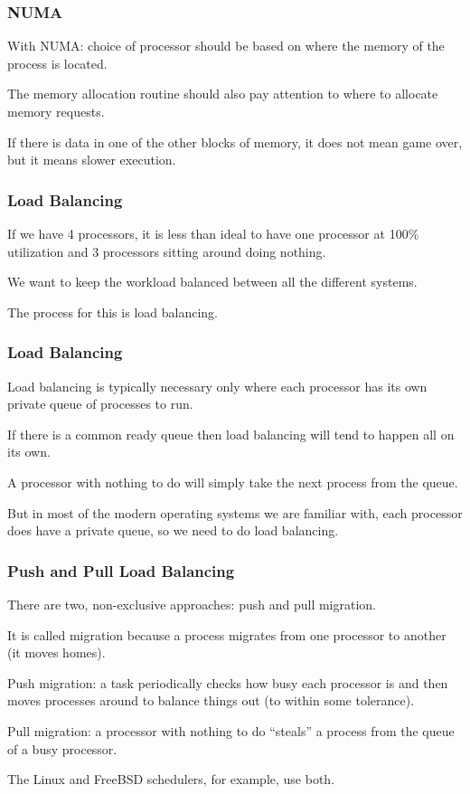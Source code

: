 \begin{frame}
\frametitle{NUMA}

With NUMA: choice of processor should be based on where the memory of the process is located.

The memory allocation routine should also pay attention to where to allocate memory requests.
  
If there is data in one of the other blocks of memory, it does not mean game over, but it means slower execution.

\end{frame}

\begin{frame}
\frametitle{Load Balancing}

If we have 4 processors, it is less than ideal to have one processor at 100\% utilization and 3 processors sitting around doing nothing. 

We want to keep the workload balanced between all the different systems. 

The process for this is \alert{load balancing}.

\end{frame}

\begin{frame}
\frametitle{Load Balancing}

Load balancing is typically necessary only where each processor has its own private queue of processes to run. 

If there is a common ready queue then load balancing will tend to happen all on its own.

A processor with nothing to do will simply take the next process from the queue. 

But in most of the modern operating systems we are familiar with, each processor does have a private queue, so we need to do load balancing.

\end{frame}

\begin{frame}
\frametitle{Push and Pull Load Balancing}

There are two, non-exclusive approaches: \alert{push} and \alert{pull} migration. 

It is called migration because a process migrates from one processor to another (it moves homes). 

Push migration: a task periodically checks how busy each processor is and then moves processes around to balance things out (to within some tolerance). 

Pull migration: a processor with nothing to do ``steals'' a process from the queue of a busy processor. 

The Linux and FreeBSD schedulers, for example, use both.

\end{frame}

